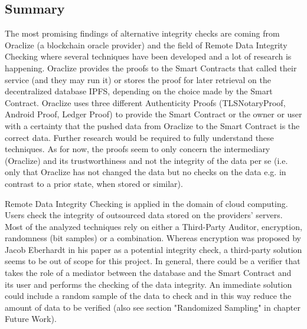 \subsection{Summary}
The most promising findings of alternative integrity checks are coming from Oraclize (a blockchain oracle provider) and the field of Remote Data Integrity Checking where several techniques have been developed and a lot of research is happening.
Oraclize provides the proofs to the Smart Contracts that called their service (and they may run it) or stores the proof for later retrieval on the decentralized database IPFS, depending on the choice made by the Smart Contract. Oraclize uses three different Authenticity Proofs (TLSNotaryProof, Android Proof, Ledger Proof) to provide the Smart Contract or the owner or user with a certainty that the pushed data from Oraclize to the Smart Contract is the correct data. Further research would be required to fully understand these techniques. As for now, the proofs seem to only concern the intermediary (Oraclize) and its trustworthiness and not the integrity of the data per se (i.e. only that Oraclize has not changed the data but no checks on the data e.g. in contrast to a prior state, when stored or similar).

Remote Data Integrity Checking is applied in the domain of cloud computing. Users check the integrity of outsourced data stored on the providers’ servers. Most of the analyzed techniques rely on either a Third-Party Auditor, encryption, randomness (bit samples) or a combination. Whereas encryption was proposed by Jacob Eberhardt in his paper as a potential integrity check, a third-party solution seems to be out of scope for this project. In general, there could be a verifier that takes the role of a mediator between the database and the Smart Contract and its user and performs the checking of the data integrity. An immediate solution could include a random sample of the data to check and in this way reduce the amount of data to be verified (also see section "Randomized Sampling" in chapter Future Work).

